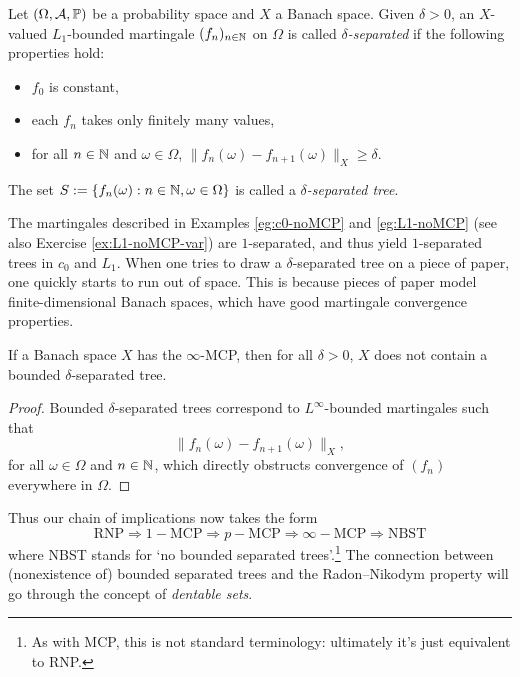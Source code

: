 \begin{defn}
  Let $(\Omega,\mathcal{A},\mathbb{P})$ be a probability space and $X$ a Banach space.
  Given $\delta > 0$, an $X$-valued $L_1$-bounded martingale $(f_n)_{n \in \mathbb{N}}$ on $\Omega$ is called \emph{$\delta$-separated} if the following properties hold:
  \begin{itemize}
  \item $f_0$ is constant,
  \item each $f_n$ takes only finitely many values,
  \item for all $n \in \mathbb{N}$ and $\omega \in \Omega$, $\|f_n(\omega) - f_{n+1}(\omega)\|_X \geq \delta$.
  \end{itemize}
  The set $S := \{f_n(\omega) : n \in \mathbb{N}, \omega \in \Omega\}$ is called a \emph{$\delta$-separated tree}.  
\end{defn}

The martingales described in Examples \ref{eg:c0-noMCP} and \ref{eg:L1-noMCP} (see also Exercise \ref{ex:L1-noMCP-var}) are $1$-separated, and thus yield $1$-separated trees in $c_0$ and $L_1$.
When one tries to draw a $\delta$-separated tree on a piece of paper, one quickly starts to run out of space.
This is because pieces of paper model finite-dimensional Banach spaces, which have good martingale convergence properties.

\begin{prop}
  If a Banach space $X$ has the $\infty$-MCP, then for all $\delta > 0$, $X$ does not contain a bounded $\delta$-separated tree.
\end{prop}

\begin{proof}
  Bounded $\delta$-separated trees correspond to $L^\infty$-bounded martingales such that
  \begin{equation*}
    \|f_n(\omega) - f_{n+1}(\omega)\|_{X},
  \end{equation*}
  for all $\omega \in \Omega$ and $n \in \mathbb{N}$,
  which directly obstructs convergence of $(f_n)$ everywhere in $\Omega$.
\end{proof}

Thus our chain of implications now takes the form
\begin{equation*}
  \mathrm{RNP} \Longrightarrow 1-\mathrm{MCP} \Longrightarrow p-\mathrm{MCP} \Longrightarrow \infty-\mathrm{MCP}
  \Longrightarrow \mathrm{NBST}
\end{equation*}
where NBST stands for `no bounded separated trees'.\footnote{As with MCP, this is not standard terminology: ultimately it's just equivalent to RNP.}
The connection between (nonexistence of) bounded separated trees and the Radon--Nikodym property will go through the concept of \emph{dentable sets}.

